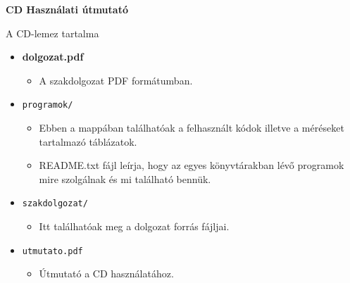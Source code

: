 \pagestyle{empty}

\noindent \textbf{\Large CD Használati útmutató}

\vskip 1cm

\noindent A CD-lemez tartalma

\begin{itemize}
    \item \textbf{dolgozat.pdf}
        \begin{itemize}
            \item A szakdolgozat PDF formátumban.
        \end{itemize}
	\item \texttt{programok/}
		\begin{itemize}
			\item Ebben a mappában találhatóak a felhasznált kódok illetve a méréseket tartalmazó táblázatok.
			\item README.txt fájl leírja, hogy az egyes könyvtárakban lévő programok mire szolgálnak és mi található bennük.
		\end{itemize}
	\item \texttt{szakdolgozat/}
		\begin{itemize}
			\item Itt találhatóak meg a dolgozat forrás fájljai.
		\end{itemize}
	\item \texttt{utmutato.pdf}
    \begin{itemize}
        \item Útmutató a CD használatához.
    \end{itemize}
\end{itemize}


%
